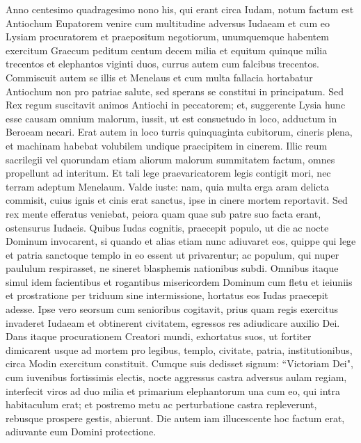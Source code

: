 \begin{biblechapter}  
\verse Anno centesimo quadragesimo nono his, qui erant circa Iudam, notum factum est Antiochum Eupatorem venire cum multitudine adversus Iudaeam 
\verse et cum eo Lysiam procuratorem et praepositum negotiorum, unumquemque habentem exercitum Graecum peditum centum decem milia et equitum quinque milia trecentos et elephantos viginti duos, currus autem cum falcibus trecentos. 
\verse Commiscuit autem se illis et Menelaus et cum multa fallacia hortabatur Antiochum non pro patriae salute, sed sperans se constitui in principatum. 
\verse Sed Rex regum suscitavit animos Antiochi in peccatorem; et, suggerente Lysia hunc esse causam omnium malorum, iussit, ut est consuetudo in loco, adductum in Beroeam necari. 
\verse Erat autem in loco turris quinquaginta cubitorum, cineris plena, et machinam habebat volubilem undique praecipitem in cinerem. 
\verse Illic reum sacrilegii vel quorundam etiam aliorum malorum summitatem factum, omnes propellunt ad interitum. 
\verse Et tali lege praevaricatorem legis contigit mori, nec terram adeptum Menelaum. 
\verse Valde iuste: nam, quia multa erga aram delicta commisit, cuius ignis et cinis erat sanctus, ipse in cinere mortem reportavit. 
\verse Sed rex mente efferatus veniebat, peiora quam quae sub patre suo facta erant, ostensurus Iudaeis. 
\verse Quibus Iudas cognitis, praecepit populo, ut die ac nocte Dominum invocarent, si quando et alias etiam nunc adiuvaret eos, 
\verse quippe qui lege et patria sanctoque templo in eo essent ut privarentur; ac populum, qui nuper paululum respirasset, ne sineret blasphemis nationibus subdi.  
\verse Omnibus itaque simul idem facientibus et rogantibus misericordem Dominum cum fletu et ieiuniis et prostratione per triduum sine intermissione, hortatus eos Iudas praecepit adesse. 
\verse Ipse vero seorsum cum senioribus cogitavit, prius quam regis exercitus invaderet Iudaeam et obtinerent civitatem, egressos res adiudicare auxilio Dei. 
\verse Dans itaque procurationem Creatori mundi, exhortatus suos, ut fortiter dimicarent usque ad mortem pro legibus, templo, civitate, patria, institutionibus, circa Modin exercitum constituit. 
\verse Cumque suis dedisset signum: “Victoriam Dei", cum iuvenibus fortissimis electis, nocte aggressus castra adversus aulam regiam, interfecit viros ad duo milia et primarium elephantorum una cum eo, qui intra habitaculum erat; 
\verse et postremo metu ac perturbatione castra repleverunt, rebusque prospere gestis, abierunt. 
\verse Die autem iam illucescente hoc factum erat, adiuvante eum Domini protectione. 

\end{biblechapter}
